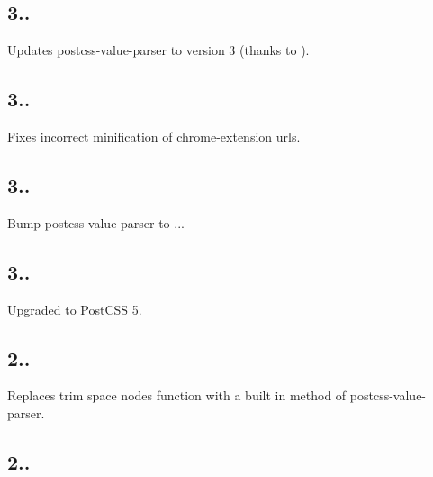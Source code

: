 \subsection*{3..}


\begin{DoxyItemize}
\item Updates postcss-\/value-\/parser to version 3 (thanks to ).
\end{DoxyItemize}

\subsection*{3..}


\begin{DoxyItemize}
\item Fixes incorrect minification of chrome-\/extension urls.
\end{DoxyItemize}

\subsection*{3..}


\begin{DoxyItemize}
\item Bump postcss-\/value-\/parser to {..}.
\end{DoxyItemize}

\subsection*{3..}


\begin{DoxyItemize}
\item Upgraded to Post\+C\+SS 5.
\end{DoxyItemize}

\subsection*{2..}


\begin{DoxyItemize}
\item Replaces trim space nodes function with a built in method of postcss-\/value-\/parser.
\end{DoxyItemize}

\subsection*{2..}


